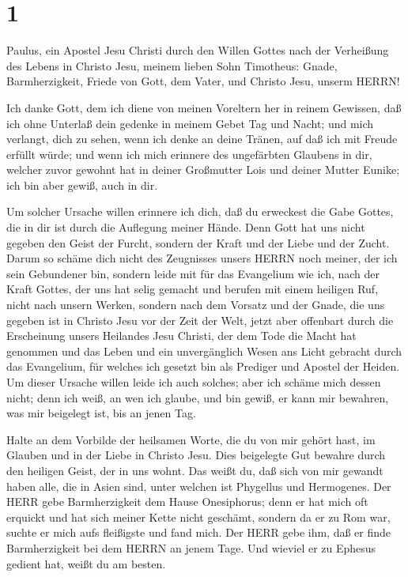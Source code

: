 \hypertarget{section}{%
\section{1}\label{section}}

 Paulus, ein Apostel Jesu Christi durch den Willen Gottes
nach der Verheißung des Lebens in Christo Jesu,  meinem
lieben Sohn Timotheus: Gnade, Barmherzigkeit, Friede von Gott, dem
Vater, und Christo Jesu, unserm HERRN!

 Ich danke Gott, dem ich diene von meinen Voreltern her in
reinem Gewissen, daß ich ohne Unterlaß dein gedenke in meinem Gebet Tag
und Nacht;  und mich verlangt, dich zu sehen, wenn ich denke
an deine Tränen, auf daß ich mit Freude erfüllt würde;  und
wenn ich mich erinnere des ungefärbten Glaubens in dir, welcher zuvor
gewohnt hat in deiner Großmutter Lois und deiner Mutter Eunike; ich bin
aber gewiß, auch in dir.

 Um solcher Ursache willen erinnere ich dich, daß du
erweckest die Gabe Gottes, die in dir ist durch die Auflegung meiner
Hände.  Denn Gott hat uns nicht gegeben den Geist der
Furcht, sondern der Kraft und der Liebe und der Zucht. 
Darum so schäme dich nicht des Zeugnisses unsers HERRN noch meiner, der
ich sein Gebundener bin, sondern leide mit für das Evangelium wie ich,
nach der Kraft Gottes,  der uns hat selig gemacht und
berufen mit einem heiligen Ruf, nicht nach unsern Werken, sondern nach
dem Vorsatz und der Gnade, die uns gegeben ist in Christo Jesu vor der
Zeit der Welt,  jetzt aber offenbart durch die Erscheinung
unsers Heilandes Jesu Christi, der dem Tode die Macht hat genommen und
das Leben und ein unvergänglich Wesen ans Licht gebracht durch das
Evangelium,  für welches ich gesetzt bin als Prediger und
Apostel der Heiden.  Um dieser Ursache willen leide ich
auch solches; aber ich schäme mich dessen nicht; denn ich weiß, an wen
ich glaube, und bin gewiß, er kann mir bewahren, was mir beigelegt ist,
bis an jenen Tag.

 Halte an dem Vorbilde der heilsamen Worte, die du von mir
gehört hast, im Glauben und in der Liebe in Christo Jesu. 
Dies beigelegte Gut bewahre durch den heiligen Geist, der in uns wohnt.
 Das weißt du, daß sich von mir gewandt haben alle, die in
Asien sind, unter welchen ist Phygellus und Hermogenes. 
Der HERR gebe Barmherzigkeit dem Hause Onesiphorus; denn er hat mich oft
erquickt und hat sich meiner Kette nicht geschämt,  sondern
da er zu Rom war, suchte er mich aufs fleißigste und fand mich.
 Der HERR gebe ihm, daß er finde Barmherzigkeit bei dem
HERRN an jenem Tage. Und wieviel er zu Ephesus gedient hat, weißt du am
besten.

